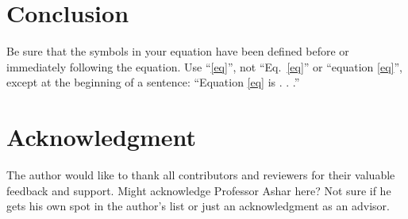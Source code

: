 \documentclass[conference]{IEEEtran}
\begin{document}
\section{Conclusion}

Be sure that the 
symbols in your equation have been defined before or immediately following 
the equation.
Use ``\eqref{eq}'', not ``Eq.~\eqref{eq}'' or ``equation \eqref{eq}'', except at 
the beginning of a sentence: ``Equation \eqref{eq} is . . .''

\section*{Acknowledgment}

The author would like to thank all contributors and reviewers for their valuable feedback and support.
Might acknowledge Professor Ashar here?
Not sure if he gets his own spot in the author's list or just an acknowledgment as an advisor.
\nocite{*} %


\end{document}
